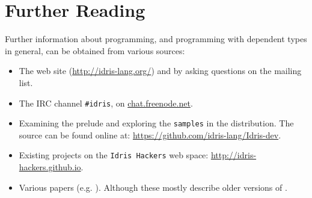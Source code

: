 \section{Further Reading}

Further information about \Idris{} programming, and programming with dependent
types in general, can be obtained from various sources:

\begin{itemize}
\item The \Idris{} web site (\url{http://idris-lang.org/}) and by asking questions on the mailing list.
\item The IRC channel \texttt{\#idris}, on \url{chat.freenode.net}.
\item Examining the prelude and exploring the \texttt{samples} in the distribution.
The \Idris{} source can be found online at: \url{https://github.com/idris-lang/Idris-dev}.
\item Existing projects on the \texttt{Idris Hackers} web space: \url{http://idris-hackers.github.io}.
\item Various papers (e.g. \cite{plpv11, scrap-engine,res-dsl-padl12}).
Although these mostly describe older versions of \Idris{}.
\end{itemize}

